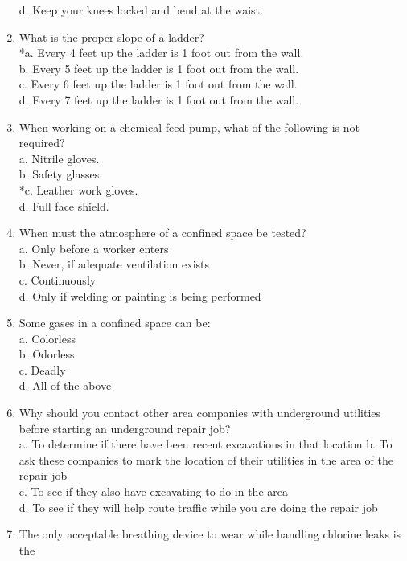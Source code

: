 \begin{enumerate}[1.]
d. Keep your knees locked and bend at the waist.\\
\item What is the proper slope of a ladder?\\
*a. Every 4 feet up the ladder is 1 foot out from the wall.\\
b. Every 5 feet up the ladder is 1 foot out from the wall.\\
c. Every 6 feet up the ladder is 1 foot out from the wall.\\
d. Every 7 feet up the ladder is 1 foot out from the wall.\\
\item When working on a chemical feed pump, what of the following is not required?\\
a. Nitrile gloves.\\
b. Safety glasses.\\
*c. Leather work gloves.\\
d. Full face shield.\\
\item When must the atmosphere of a confined space be tested?\\
a. Only before a worker enters\\
b. Never, if adequate ventilation exists\\
c. Continuously\\
d. Only if welding or painting is being performed\\
\item Some gases in a confined space can be:\\
a. Colorless\\
b. Odorless\\
c. Deadly\\
d. All of the above\\
\item Why should you contact other area companies with underground utilities before starting an underground repair job?\\
a. To determine if there have been recent excavations in that location b. To ask these companies to mark the location of their utilities in the area of the repair job\\
c. To see if they also have excavating to do in the area\\
d. To see if they will help route traffic while you are doing the repair job\\
\item The only acceptable breathing device to wear while handling chlorine leaks is the\\

\end{enumerate}
